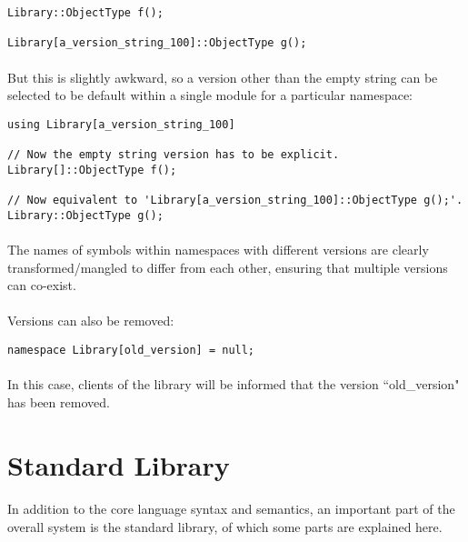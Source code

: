 \documentclass[12pt,twoside,notitlepage]{report}
\begin{document}
\begin{lstlisting}
Library::ObjectType f();

Library[a_version_string_100]::ObjectType g();
\end{lstlisting}

\paragraph{}
But this is slightly awkward, so a version other than the empty string can be selected to be default within a single module for a particular namespace:

\begin{lstlisting}
using Library[a_version_string_100]

// Now the empty string version has to be explicit.
Library[]::ObjectType f();

// Now equivalent to 'Library[a_version_string_100]::ObjectType g();'.
Library::ObjectType g();
\end{lstlisting}

\paragraph{}
The names of symbols within namespaces with different versions are clearly transformed/mangled to differ from each other, ensuring that multiple versions can co-exist.

\paragraph{}
Versions can also be removed:

\begin{lstlisting}
namespace Library[old_version] = null;
\end{lstlisting}

\paragraph{}
In this case, clients of the library will be informed that the version ``old\_version" has been removed.

\clearpage

\section{Standard Library}

\paragraph{}
In addition to the core language syntax and semantics, an important part of the overall system is the standard library, of which some parts are explained here.
\end{document}
